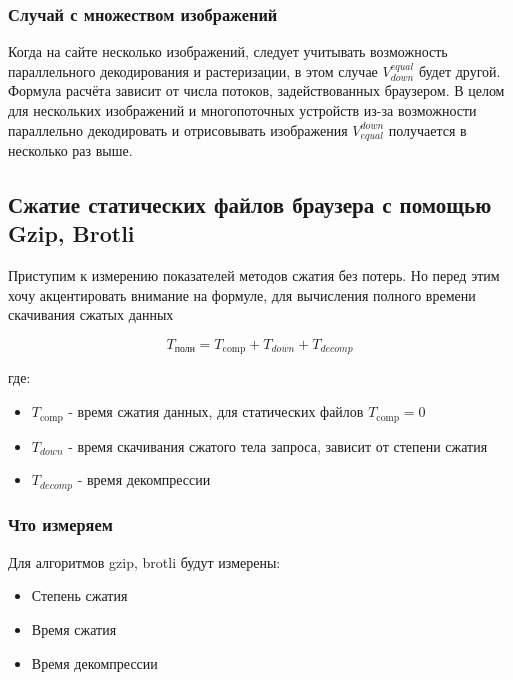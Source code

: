 \documentclass[12pt]{article}
\begin{document}
\subsubsection{Случай с множеством изображений }

Когда на сайте несколько изображений, следует учитывать возможность
параллельного декодирования и растеризации, в этом случае $V^{equal}_{down}$
будет другой. Формула расчёта зависит от числа потоков, задействованных браузером.
В целом для нескольких изображений и многопоточных устройств из-за возможности
параллельно декодировать и отрисовывать изображения $V^{down}_{equal}$ получается
в несколько раз выше.

\subsection{Сжатие статических файлов браузера с помощью Gzip, Brotli}

Приступим к измерению показателей методов сжатия без потерь. Но перед этим хочу
акцентировать внимание на формуле, для вычисления полного времени скачивания
сжатых данных

\begin{equation}
    T_{\text{полн}} = T_{\text{comp}} + T_{down} + T_{decomp}
\end{equation}

где:

\begin{itemize}
    \item $T_{\text{comp}}$ - время сжатия данных, для статических файлов $T_{\text{comp}}=0$
    \item $T_{down}$ - время скачивания сжатого тела запроса, зависит от степени сжатия
    \item $T_{decomp}$ - время декомпрессии
\end{itemize}

\subsubsection{Что измеряем}

Для алгоритмов gzip, brotli будут измерены:

\begin{itemize}[label=-]
    \item Степень сжатия
    \item Время сжатия
    \item Время декомпрессии
\end{itemize}
\end{document}
